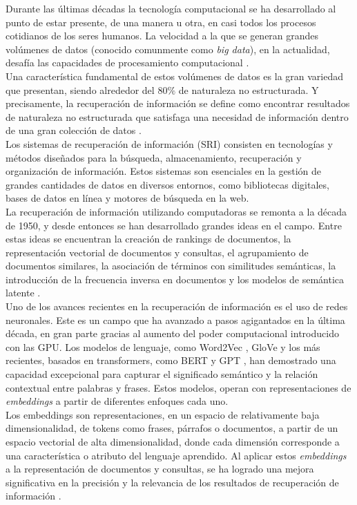 Durante las últimas décadas la tecnología computacional se ha desarrollado al punto de estar presente, de una manera u otra, en casi todos los procesos cotidianos de los seres humanos. La velocidad a la que se generan grandes volúmenes de datos (conocido comunmente como \textit{big data}), en la actualidad, desafía las capacidades de procesamiento computacional \cite{RiseofBigData}.\\
Una característica fundamental de estos volúmenes de datos es la gran variedad que presentan, siendo alrededor del 80$\%$ de naturaleza no estructurada. Y precisamente, la recuperación de información se define como encontrar resultados de naturaleza no estructurada que satisfaga una necesidad de información dentro de una gran colección de datos \cite{manning2008introductiontoIR}.\\
Los sistemas de recuperación de información (SRI) consisten en tecnologías y métodos diseñados para la búsqueda, almacenamiento, recuperación y organización de información. Estos sistemas son esenciales en la gestión de grandes cantidades de datos en diversos entornos, como bibliotecas digitales, bases de datos en línea y motores de búsqueda en la web.\\ 
La recuperación de información utilizando computadoras  se remonta a la década de 1950, y desde entonces se han desarrollado grandes ideas en el campo. Entre estas ideas se encuentran la creación de rankings de documentos, la representación vectorial de documentos y consultas, el agrupamiento de documentos similares, la asociación de términos con similitudes semánticas, la introducción de la frecuencia inversa en documentos y los modelos de semántica latente \cite{SRIConf1}.\\
Uno de los avances recientes en la recuperación de información es el uso de redes neuronales. Este es un campo que ha avanzado a pasos agigantados en la última década, en gran parte gracias al aumento del poder computacional introducido con las GPU. Los modelos de lenguaje, como Word2Vec \cite{Mikolov2013EfficientEO}, GloVe \cite{Pennington2014GloVeGV} y los más recientes, basados en transformers, como BERT \cite{Devlin2019BERTPO} y GPT \cite{Radford2018ImprovingLU}, han demostrado una capacidad excepcional para capturar el significado semántico y la relación contextual entre palabras y frases. Estos modelos, operan con representaciones de \textit{embeddings} a partir de diferentes enfoques cada uno.\\
Los embeddings son representaciones, en un espacio de relativamente baja dimensionalidad, de tokens como frases, párrafos o documentos, a partir de un espacio vectorial de alta dimensionalidad, donde cada dimensión corresponde a una característica o atributo del lenguaje aprendido. Al aplicar estos \textit{embeddings} a la representación de documentos y consultas, se ha logrado una mejora significativa en la precisión y la relevancia de los resultados de recuperación de información \cite{docEmbReview}.\\ 

